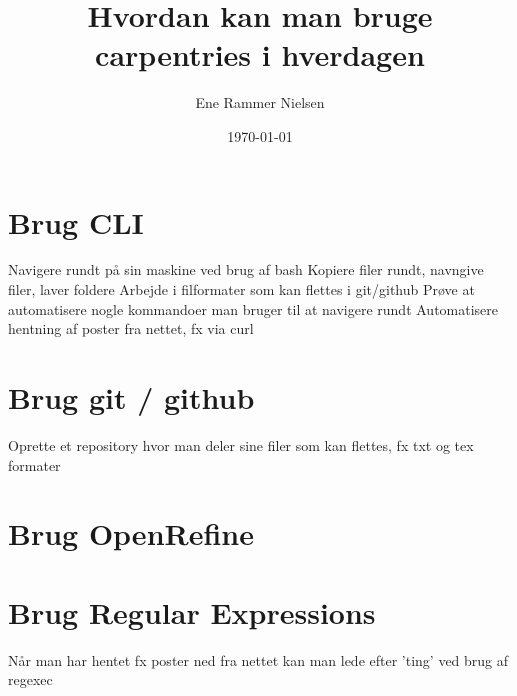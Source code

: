 \documentclass[11pt,a4paper]{report}
\title{Hvordan kan man bruge carpentries i hverdagen}
\author{Ene Rammer Nielsen}
\date{\today}
\begin{document}
\maketitle
\chapter*{Brug CLI}
Navigere rundt på sin maskine ved brug af bash
\newline
Kopiere filer rundt, navngive filer, laver foldere
\newline
Arbejde i filformater som kan flettes i git/github
\newline
Prøve at automatisere nogle kommandoer man bruger til at navigere rundt
\newline
Automatisere hentning af poster fra nettet, fx via curl

\chapter*{Brug git / github}
Oprette et repository hvor man deler sine filer som kan flettes, fx txt og tex formater

\chapter*{Brug OpenRefine}


\chapter*{Brug Regular Expressions}
Når man har hentet fx poster ned fra nettet kan man lede efter 'ting' ved brug af regexec
\end{document}
